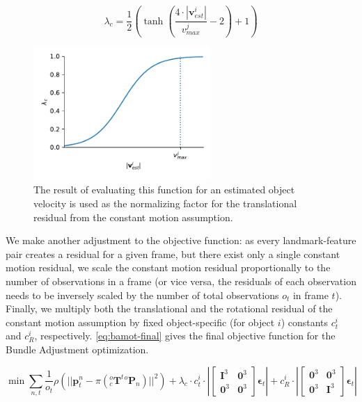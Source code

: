\documentclass[headsepline, hidelinks, footsepline, footinclude=false, oneside, fontsize=11pt, paper=a4, listof=totoc, bibliography=totoc]{scrbook}
\begin{document}
\begin{equation}
\label{eq:norm-trans}
\lambda_c = \frac{1}{2}(\tanh(\frac{4 \cdot |\mathbf{v}_{est}^i|}{v_{max}^j} - 2)+1)
\end{equation}

\begin{figure}[htbp]
\centering
\includegraphics[width=0.6\textwidth]{figures/norm-trans.pdf}
\caption{\label{fig:norm-trans}The result of evaluating this function for an estimated object velocity is used as the normalizing factor for the translational residual from the constant motion assumption.}
\end{figure}

We make another adjustment to the objective function: as every landmark-feature pair creates a residual for a given frame, but there exist only a single constant motion residual, we scale the constant motion residual proportionally to the number of observations in a frame (or vice versa, the residuals of each observation needs to be inversely scaled by the number of total observations \(o_t\) in frame \(t\)).
Finally, we multiply both the translational and the rotational residual of the constant motion assumption by fixed object-specific (for object \(i\)) constants \(c^i_t\) and \(c^i_R\), respectively.
\cref{eq:bamot-final} gives the final objective function for the Bundle Adjustment optimization.

\begin{equation}
\label{eq:bamot-final}
    \min \sum_{n, t}\frac{1}{o_t}\rho(||\mathbf{p}_{t}^{n} - \pi({}^{o}_{c}\mathbf{T}^{t}{}^{o}\mathbf{P}_{n})||^2) 
+ \lambda_c \cdot c^i_t \cdot |\begin{bmatrix} \mathbf{I}^3 & \mathbf{0}^3 \\ \mathbf{0}^3 & \mathbf{0}^3 \end{bmatrix} \boldsymbol{\epsilon}_t|
+ c^i_R \cdot |\begin{bmatrix} \mathbf{0}^3 & \mathbf{0}^3 \\ \mathbf{0}^3 & \mathbf{I}^3 \end{bmatrix} \boldsymbol{\epsilon}_t|
\end{equation}
\end{document}
